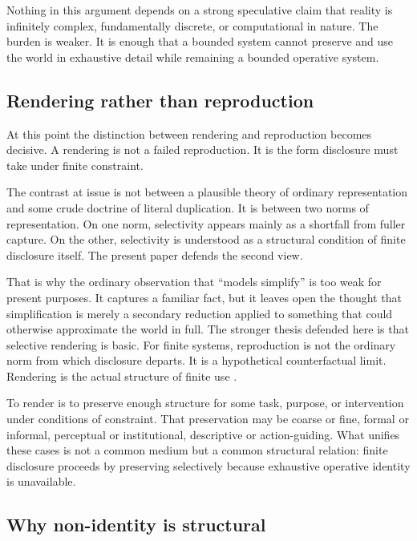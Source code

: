 \documentclass[11pt]{article}
\begin{document}
Nothing in this argument depends on a strong speculative claim that reality is infinitely complex, fundamentally discrete, or computational in nature. The burden is weaker. It is enough that a bounded system cannot preserve and use the world in exhaustive detail while remaining a bounded operative system.

\subsection{Rendering rather than reproduction}

At this point the distinction between rendering and reproduction becomes decisive. A rendering is not a failed reproduction. It is the form disclosure must take under finite constraint.

The contrast at issue is not between a plausible theory of ordinary representation and some crude doctrine of literal duplication. It is between two norms of representation. On one norm, selectivity appears mainly as a shortfall from fuller capture. On the other, selectivity is understood as a structural condition of finite disclosure itself. The present paper defends the second view.

That is why the ordinary observation that ``models simplify'' is too weak for present purposes. It captures a familiar fact, but it leaves open the thought that simplification is merely a secondary reduction applied to something that could otherwise approximate the world in full. The stronger thesis defended here is that selective rendering is basic. For finite systems, reproduction is not the ordinary norm from which disclosure departs. It is a hypothetical counterfactual limit. Rendering is the actual structure of finite use \cite{FriggNguyen2021ScientificRepresentationSEP,FriggHartmann2025ModelsScienceSEP}.

To render is to preserve enough structure for some task, purpose, or intervention under conditions of constraint. That preservation may be coarse or fine, formal or informal, perceptual or institutional, descriptive or action-guiding. What unifies these cases is not a common medium but a common structural relation: finite disclosure proceeds by preserving selectively because exhaustive operative identity is unavailable.

\subsection{Why non-identity is structural}
\end{document}

